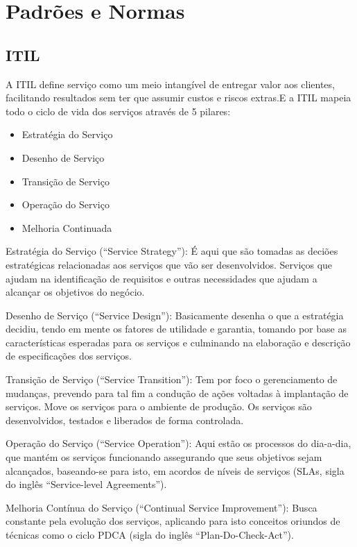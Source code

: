 \section{Padrões e Normas}
\subsection{ITIL}

A ITIL define serviço como um meio intangível de entregar valor aos clientes,
facilitando resultados sem ter que assumir custos e riscos extras.E a ITIL mapeia
todo o ciclo de vida dos serviços através de 5 pilares\cite{itsmfservice}:
\begin{itemize}[noitemsep]
  \item Estratégia do Serviço
  \item Desenho de Serviço
  \item Transição de Serviço
  \item Operação do Serviço
  \item Melhoria Continuada
\end{itemize}

Estratégia do Serviço (“Service Strategy”): É aqui que são tomadas as deciões
estratégicas relacionadas aos serviços que vão ser desenvolvidos. Serviços que
ajudam na identificação de requisitos e outras necessidades que ajudam a
alcançar os objetivos do negócio.

Desenho de Serviço (“Service Design”): Basicamente desenha o que a estratégia
decidiu, tendo em mente os fatores de utilidade e garantia, tomando por base
as características esperadas para os serviços e culminando na elaboração e
descrição de especificações dos serviços.

Transição de Serviço (“Service Transition”): Tem por foco o gerenciamento de
mudanças, prevendo para tal fim a condução de ações voltadas à implantação de
serviços. Move os serviços para o ambiente de produção. Os serviços são
desenvolvidos, testados e liberados de forma controlada.

Operação do Serviço (“Service Operation”): Aqui estão os processos do dia-a-dia,
 que mantém os serviços funcionando assegurando que seus objetivos sejam
 alcançados, baseando-se para isto, em acordos de níveis de serviços
 (SLAs, sigla do inglês “Service-level Agreements”).

Melhoria Contínua do Serviço (“Continual Service Improvement”): Busca
constante pela evolução dos serviços, aplicando para isto conceitos
oriundos de técnicas como o ciclo PDCA (sigla do inglês “Plan-Do-Check-Act”).

